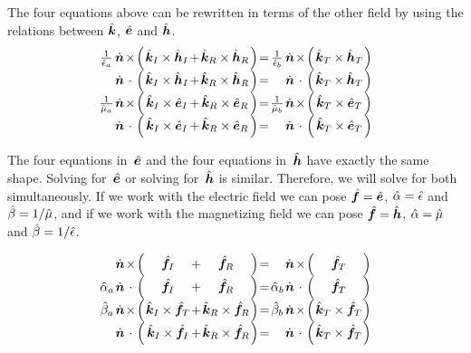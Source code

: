 The four equations above can be rewritten in terms of the other field by using the relations between $\hat{\bm{k}}$, $\hat{\bm{e}}$ and $\hat{\bm{h}}$.
\begin{equation}
    \arraycolsep=0.5pt%
    \begin{array}{ccccccccccccccc}
        \frac{1}{\cp{\epsilon}_a} & \vectu{n} & \times & \Big( & \vectcp{k}_\I \times \vectcp{h}_\I & + & \vectcp{k}_\R \times \vectcp{h}_\R & \Big) & = & \frac{1}{\cp{\epsilon}_b} & \vectu{n} & \times & \Big( & \vectcp{k}_\T \times \vectcp{h}_\T & \Big)
        \\
        & \vectu{n} & \cdot & \Big( & \vectcp{k}_\I \times \vectcp{h}_\I & + & \vectcp{k}_\R \times \vectcp{h}_\R & \Big) & = & & \vectu{n} & \cdot & \Big( & \vectcp{k}_\T \times \vectcp{h}_\T & \Big)
        \\
        \frac{1}{\cp{\mu}_a} & \vectu{n} & \times & \Big( & \vectcp{k}_\I \times \vectcp{e}_\I & + & \vectcp{k}_\R \times \vectcp{e}_\R & \Big) & = & \frac{1}{\cp{\mu}_b} & \vectu{n} & \times & \Big( & \vectcp{k}_\T \times \vectcp{e}_\T & \Big)
        \\
        & \vectu{n} & \cdot & \Big( & \vectcp{k}_\I \times \vectcp{e}_\I & + & \vectcp{k}_\R \times \vectcp{e}_\R & \Big) & = & & \vectu{n} & \cdot & \Big( & \vectcp{k}_\T \times \vectcp{e}_\T & \Big)
    \end{array}
\end{equation}

The four equations in~$\hat{\bm{e}}$ and the four equations in~$\hat{\bm{h}}$ have exactly the same shape.
Solving for~$\hat{\bm{e}}$ or solving for~$\hat{\bm{h}}$ is similar.
Therefore, we will solve for both simultaneously.
If we work with the electric field we can pose
$\hat{\bm{f}}=\hat{\bm{e}}$, $\hat{\alpha}=\hat{\epsilon}$ and $\hat{\beta}=1/\hat{\mu}$,
and if we work with the magnetizing field we can pose
$\hat{\bm{f}}=\hat{\bm{h}}$, $\hat{\alpha}=\hat{\mu}$ and $\hat{\beta}=1/\hat{\epsilon}$.

\begin{equation}
    \arraycolsep=0.5pt%
    \begin{array}{ccccccccccccccc}
        & \vectu{n} & \times & \Big( & \vectcp{f}_\I & + & \vectcp{f}_\R & \Big) & = & & \vectu{n} & \times & \Big( & \vectcp{f}_\T & \Big)
        \\
        \cp{\alpha}_a & \vectu{n} & \cdot & \Big( & \vectcp{f}_\I & + & \vectcp{f}_\R & \Big) & = & \cp{\alpha}_b & \vectu{n} & \cdot & \Big( & \vectcp{f}_\T & \Big)
        \\
        \cp{\beta}_a & \vectu{n} & \times & \Big( & \vectcp{k}_\I \times \vectcp{f}_\T & + & \vectcp{k}_\R \times \vectcp{f}_\R & \Big) & = & \cp{\beta}_b & \vectu{n} & \times & \Big( & \vectcp{k}_\T \times \vectcp{f}_\T & \Big)
        \\
        & \vectu{n} & \cdot & \Big( & \vectcp{k}_\I \times \vectcp{f}_\I & + & \vectcp{k}_\R \times \vectcp{f}_\R & \Big) & = & & \vectu{n} & \cdot & \Big( & \vectcp{k}_\T \times \vectcp{f}_\T & \Big)
    \end{array}
\end{equation}

